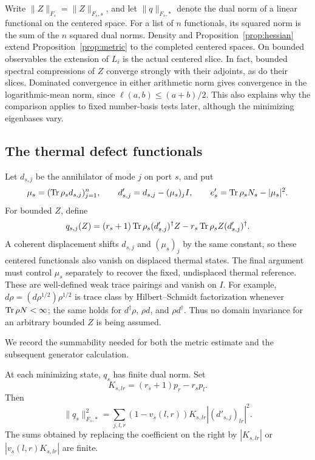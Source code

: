 Write $\|Z\|_{F_s}=\|Z\|_{F_s,s}$, and let
$\|q\|_{F_s,*}$ denote the dual norm of a linear functional on the centered
space.  For a list of $n$ functionals, its squared norm is the sum of the
$n$ squared dual norms.  Density and Proposition~\ref{prop:hessian} extend
Proposition~\ref{prop:metric} to the completed centered spaces.
On bounded observables the extension of $L_i$ is the actual centered
slice.  In fact, bounded spectral compressions of $Z$ converge strongly
with their adjoints, as do their slices.  Dominated convergence in either
arithmetic norm gives convergence in the logarithmic-mean norm, since
$\ell(a,b)\le(a+b)/2$.  This also explains why the comparison applies to
fixed number-basis tests later, although the minimizing eigenbases vary.

\subsection{The thermal defect functionals}
Let $d_{s,j}$ be the annihilator of mode $j$ on port $s$, and put
\[
 \mu_s=(\operatorname{Tr}\rho_s d_{s,j})_{j=1}^n,\qquad
 d'_{s,j}=d_{s,j}-(\mu_s)_jI,\qquad
 e'_s=\operatorname{Tr}\rho_sN_s-|\mu_s|^2.
\]
For bounded $Z$, define
\begin{equation}\label{eq:thermal-defect}
 q_{s,j}(Z)=(r_s+1)\operatorname{Tr}\rho_s(d'_{s,j})^\dagger Z
             -r_s\operatorname{Tr}\rho_sZ(d'_{s,j})^\dagger.
\end{equation}
A coherent displacement shifts $d_{s,j}$ and $(\mu_s)_j$ by the same
constant, so these centered functionals also vanish on displaced thermal
states. The final argument must control $\mu_s$ separately to recover the
fixed, undisplaced thermal reference.
These are well-defined weak trace pairings and vanish on $I$.
For example, $d\rho=(d\rho^{1/2})\rho^{1/2}$ is trace class by
Hilbert--Schmidt factorization whenever $\operatorname{Tr}\rho N<\infty$; the same
holds for $d^\dagger\rho$, $\rho d$, and $\rho d^\dagger$.
Thus no domain invariance for an arbitrary bounded $Z$ is being assumed.

We record the summability needed for both the metric estimate and the
subsequent generator calculation.

\begin{lemma}\label{lem:dual-finiteness}
At each minimizing state, $q_s$ has finite dual norm.  Set
\[
 K_{s,lr}=(r_s+1)p_r-r_sp_l.
\]
Then
\begin{equation}\label{eq:dual-norm-sum}
 \|q_s\|_{F_s,*}^2
 =\sum_{j,l,r}(1-v_s(l,r))K_{s,lr}|(d'_{s,j})_{lr}|^2.
\end{equation}
The sums obtained by replacing the coefficient on the right by
$|K_{s,lr}|$ or $|v_s(l,r)K_{s,lr}|$ are finite.
\end{lemma}

